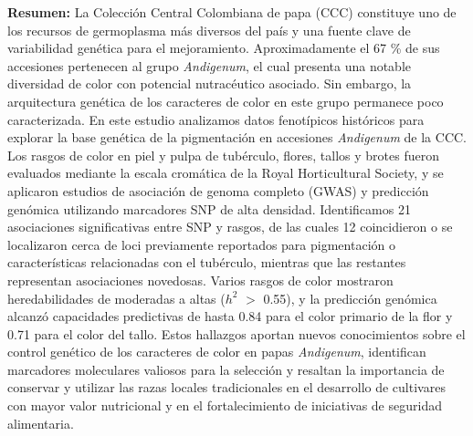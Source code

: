 \documentclass[pdflatex,sn-mathphys-ay]{sn-jnl}%
\begin{document}
{\textbf{Resumen:}
La Colección Central Colombiana de papa (CCC) constituye uno de los recursos de germoplasma más diversos del país y una fuente clave de variabilidad genética para el mejoramiento. Aproximadamente el 67 \% de sus accesiones pertenecen al grupo \textit{Andigenum}, el cual presenta una notable diversidad de color con potencial nutracéutico asociado. Sin embargo, la arquitectura genética de los caracteres de color en este grupo permanece poco caracterizada. En este estudio analizamos datos fenotípicos históricos para explorar la base genética de la pigmentación en accesiones \textit{Andigenum }de la CCC. Los rasgos de color en piel y pulpa de tubérculo, flores, tallos y brotes fueron evaluados mediante la escala cromática de la Royal Horticultural Society, y se aplicaron estudios de asociación de genoma completo (GWAS) y predicción genómica utilizando marcadores SNP de alta densidad. Identificamos 21 asociaciones significativas entre SNP y rasgos, de las cuales 12 coincidieron o se localizaron cerca de loci previamente reportados para pigmentación o características relacionadas con el tubérculo, mientras que las restantes representan asociaciones novedosas. Varios rasgos de color mostraron heredabilidades de moderadas a altas ($h^2$ $>$ 0.55), y la predicción genómica alcanzó capacidades predictivas de hasta 0.84 para el color primario de la flor y 0.71 para el color del tallo. Estos hallazgos aportan nuevos conocimientos sobre el control genético de los caracteres de color en papas \textit{Andigenum}, identifican marcadores moleculares valiosos para la selección y resaltan la importancia de conservar y utilizar las razas locales tradicionales en el desarrollo de cultivares con mayor valor nutricional y en el fortalecimiento de iniciativas de seguridad alimentaria.
}




\maketitle
\end{document}
